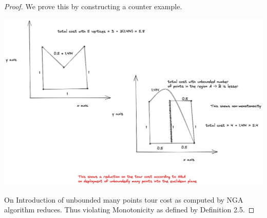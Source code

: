 \documentclass{article}
\theoremstyle{define}
\theoremstyle{remark}
\begin{document}
\begin{proof}
    We prove this by constructing a counter example.

    \includegraphics[scale=0.3]{non-monotone.png}

    On Introduction of unbounded many points tour cost as computed by \textsf{NGA} algorithm reduces.
    Thus violating Monotonicity as defined by Definition 2.5.
\end{proof}
\end{document}
